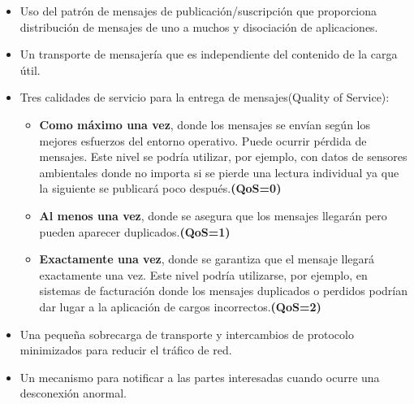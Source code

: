 \begin{itemize}
    \item Uso del patrón de mensajes de publicación/suscripción que proporciona distribución de mensajes de uno a muchos y disociación de aplicaciones.
    \item Un transporte de mensajería que es independiente del contenido de la carga útil.
    \item Tres calidades de servicio para la entrega de mensajes(Quality of Service):
    \begin{itemize}
        \item \textbf{Como máximo una vez}, donde los mensajes se envían según los mejores esfuerzos del entorno operativo. Puede ocurrir pérdida de mensajes. Este nivel se podría utilizar, por ejemplo, con datos de sensores ambientales donde no importa si se pierde una lectura individual ya que la siguiente se publicará poco después.\textbf{(QoS=0)}
        \item \textbf{Al menos una vez}, donde se asegura que los mensajes llegarán pero pueden aparecer duplicados.\textbf{(QoS=1)}
        \item \textbf{Exactamente una vez}, donde se garantiza que el mensaje llegará exactamente una vez. Este nivel podría utilizarse, por ejemplo, en sistemas de facturación donde los mensajes duplicados o perdidos podrían dar lugar a la aplicación de cargos incorrectos.\textbf{(QoS=2)}
    \end{itemize}
    \item Una pequeña sobrecarga de transporte y intercambios de protocolo minimizados para reducir el tráfico de red.
    \item Un mecanismo para notificar a las partes interesadas cuando ocurre una desconexión anormal.\cite{mqtt-v5.0}
\end{itemize}

